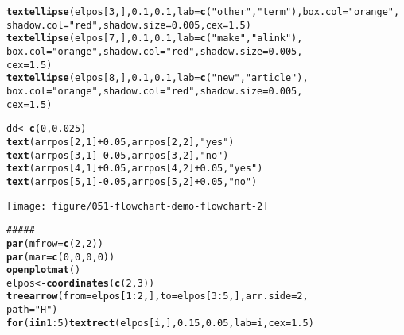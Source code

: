 \documentclass{article}\usepackage[]{graphicx}\usepackage[]{xcolor}
\makeatletter
\def\maxwidth{ %
  \ifdim\Gin@nat@width>\linewidth
    \linewidth
  \else
    \Gin@nat@width
  \fi
}
\newcommand{\hlnum}[1]{\textcolor[rgb]{0.686,0.059,0.569}{#1}}%
\newcommand{\hlsng}[1]{\textcolor[rgb]{0.192,0.494,0.8}{#1}}%
\newcommand{\hlcom}[1]{\textcolor[rgb]{0.678,0.584,0.686}{\textit{#1}}}%
\newcommand{\hlopt}[1]{\textcolor[rgb]{0,0,0}{#1}}%
\newcommand{\hldef}[1]{\textcolor[rgb]{0.345,0.345,0.345}{#1}}%
\newcommand{\hlkwa}[1]{\textcolor[rgb]{0.161,0.373,0.58}{\textbf{#1}}}%
\newcommand{\hlkwb}[1]{\textcolor[rgb]{0.69,0.353,0.396}{#1}}%
\newcommand{\hlkwc}[1]{\textcolor[rgb]{0.333,0.667,0.333}{#1}}%
\newcommand{\hlkwd}[1]{\textcolor[rgb]{0.737,0.353,0.396}{\textbf{#1}}}%
\newenvironment{kframe}{%
 \def\at@end@of@kframe{}%
 \ifinner\ifhmode%
  \def\at@end@of@kframe{\end{minipage}}%
  \begin{minipage}{\columnwidth}%
 \fi\fi%
 \def\FrameCommand##1{\hskip\@totalleftmargin \hskip-\fboxsep
 \colorbox{shadecolor}{##1}\hskip-\fboxsep
     \hskip-\linewidth \hskip-\@totalleftmargin \hskip\columnwidth}%
 \MakeFramed {\advance\hsize-\width
   \@totalleftmargin\z@ \linewidth\hsize
   \@setminipage}}%
 {\par\unskip\endMakeFramed%
 \at@end@of@kframe}
\newenvironment{knitrout}{}{} %
\makeatother
\begin{document}
\begin{knitrout}
\begin{kframe}
\begin{alltt}
\hlkwd{textellipse}\hldef{(elpos[}\hlnum{3}\hldef{, ],} \hlnum{0.1}\hldef{,} \hlnum{0.1}\hldef{,} \hlkwc{lab} \hldef{=} \hlkwd{c}\hldef{(}\hlsng{"other"}\hldef{,} \hlsng{"term"}\hldef{),} \hlkwc{box.col} \hldef{=} \hlsng{"orange"}\hldef{,}
    \hlkwc{shadow.col} \hldef{=} \hlsng{"red"}\hldef{,} \hlkwc{shadow.size} \hldef{=} \hlnum{0.005}\hldef{,} \hlkwc{cex} \hldef{=} \hlnum{1.5}\hldef{)}
\hlkwd{textellipse}\hldef{(elpos[}\hlnum{7}\hldef{, ],} \hlnum{0.1}\hldef{,} \hlnum{0.1}\hldef{,} \hlkwc{lab} \hldef{=} \hlkwd{c}\hldef{(}\hlsng{"make"}\hldef{,} \hlsng{"a link"}\hldef{),}
    \hlkwc{box.col} \hldef{=} \hlsng{"orange"}\hldef{,} \hlkwc{shadow.col} \hldef{=} \hlsng{"red"}\hldef{,} \hlkwc{shadow.size} \hldef{=} \hlnum{0.005}\hldef{,}
    \hlkwc{cex} \hldef{=} \hlnum{1.5}\hldef{)}
\hlkwd{textellipse}\hldef{(elpos[}\hlnum{8}\hldef{, ],} \hlnum{0.1}\hldef{,} \hlnum{0.1}\hldef{,} \hlkwc{lab} \hldef{=} \hlkwd{c}\hldef{(}\hlsng{"new"}\hldef{,} \hlsng{"article"}\hldef{),}
    \hlkwc{box.col} \hldef{=} \hlsng{"orange"}\hldef{,} \hlkwc{shadow.col} \hldef{=} \hlsng{"red"}\hldef{,} \hlkwc{shadow.size} \hldef{=} \hlnum{0.005}\hldef{,}
    \hlkwc{cex} \hldef{=} \hlnum{1.5}\hldef{)}

\hldef{dd} \hlkwb{<-} \hlkwd{c}\hldef{(}\hlnum{0}\hldef{,} \hlnum{0.025}\hldef{)}
\hlkwd{text}\hldef{(arrpos[}\hlnum{2}\hldef{,} \hlnum{1}\hldef{]} \hlopt{+} \hlnum{0.05}\hldef{, arrpos[}\hlnum{2}\hldef{,} \hlnum{2}\hldef{],} \hlsng{"yes"}\hldef{)}
\hlkwd{text}\hldef{(arrpos[}\hlnum{3}\hldef{,} \hlnum{1}\hldef{]} \hlopt{-} \hlnum{0.05}\hldef{, arrpos[}\hlnum{3}\hldef{,} \hlnum{2}\hldef{],} \hlsng{"no"}\hldef{)}
\hlkwd{text}\hldef{(arrpos[}\hlnum{4}\hldef{,} \hlnum{1}\hldef{]} \hlopt{+} \hlnum{0.05}\hldef{, arrpos[}\hlnum{4}\hldef{,} \hlnum{2}\hldef{]} \hlopt{+} \hlnum{0.05}\hldef{,} \hlsng{"yes"}\hldef{)}
\hlkwd{text}\hldef{(arrpos[}\hlnum{5}\hldef{,} \hlnum{1}\hldef{]} \hlopt{-} \hlnum{0.05}\hldef{, arrpos[}\hlnum{5}\hldef{,} \hlnum{2}\hldef{]} \hlopt{+} \hlnum{0.05}\hldef{,} \hlsng{"no"}\hldef{)}
\end{alltt}
\end{kframe}
\texttt{[image: figure/051-flowchart-demo-flowchart-2]} 
\begin{kframe}\begin{alltt}
\hlcom{#####}
\hlkwd{par}\hldef{(}\hlkwc{mfrow} \hldef{=} \hlkwd{c}\hldef{(}\hlnum{2}\hldef{,} \hlnum{2}\hldef{))}
\hlkwd{par}\hldef{(}\hlkwc{mar} \hldef{=} \hlkwd{c}\hldef{(}\hlnum{0}\hldef{,} \hlnum{0}\hldef{,} \hlnum{0}\hldef{,} \hlnum{0}\hldef{))}
\hlkwd{openplotmat}\hldef{()}
\hldef{elpos} \hlkwb{<-} \hlkwd{coordinates}\hldef{(}\hlkwd{c}\hldef{(}\hlnum{2}\hldef{,} \hlnum{3}\hldef{))}
\hlkwd{treearrow}\hldef{(}\hlkwc{from} \hldef{= elpos[}\hlnum{1}\hlopt{:}\hlnum{2}\hldef{, ],} \hlkwc{to} \hldef{= elpos[}\hlnum{3}\hlopt{:}\hlnum{5}\hldef{, ],} \hlkwc{arr.side} \hldef{=} \hlnum{2}\hldef{,}
    \hlkwc{path} \hldef{=} \hlsng{"H"}\hldef{)}
\hlkwa{for} \hldef{(i} \hlkwa{in} \hlnum{1}\hlopt{:}\hlnum{5}\hldef{)} \hlkwd{textrect}\hldef{(elpos[i, ],} \hlnum{0.15}\hldef{,} \hlnum{0.05}\hldef{,} \hlkwc{lab} \hldef{= i,} \hlkwc{cex} \hldef{=} \hlnum{1.5}\hldef{)}


\end{alltt}
\end{kframe}
\end{knitrout}
\end{document}
